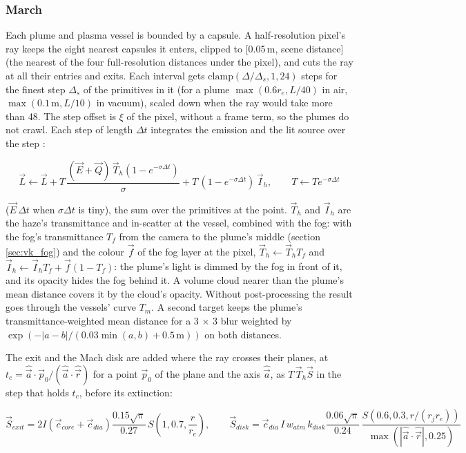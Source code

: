 \documentclass[Orbiter Technical Reference.tex]{subfiles}
\begin{document}
\begin{sloppypar}
\subsubsection{March}
Each plume and plasma vessel is bounded by a capsule. A half-resolution pixel's ray keeps the eight nearest capsules it enters, clipped to [0.05\,m, scene distance] (the nearest of the four full-resolution distances under the pixel), and cuts the ray at all their entries and exits. Each interval gets $\mathrm{clamp}(\Delta/\Delta_{s}, 1, 24)$ steps for the finest step $\Delta_{s}$ of the primitives in it (for a plume $\max(0.6r_{e}, L/40)$ in air, $\max(0.1\,\mathrm{m}, L/10)$ in vacuum), scaled down when the ray would take more than 48. The step offset is $\xi$ of the pixel, without a frame term, so the plumes do not crawl. Each step of length $\Delta t$ integrates the emission and the lit source over the step \cite{hillaire2015}:

\[ \vec{L} \leftarrow \vec{L} + T\,\frac{(\vec{E} + \vec{Q})\,\vec{T}_{h}(1 - e^{-\sigma\Delta t})}{\sigma} + T\,(1 - e^{-\sigma\Delta t})\,\vec{I}_{h}, \qquad T \leftarrow T e^{-\sigma\Delta t} \]

\noindent
($\vec{E}\,\Delta t$ when $\sigma\Delta t$ is tiny), the sum over the primitives at the point. $\vec{T}_{h}$ and $\vec{I}_{h}$ are the haze's transmittance and in-scatter at the vessel, combined with the fog: with the fog's transmittance $T_{f}$ from the camera to the plume's middle (section \ref{sec:vk_fog}) and the colour $\vec{f}$ of the fog layer at the pixel, $\vec{T}_{h} \leftarrow \vec{T}_{h}T_{f}$ and $\vec{I}_{h} \leftarrow \vec{I}_{h}T_{f} + \vec{f}(1 - T_{f})$: the plume's light is dimmed by the fog in front of it, and its opacity hides the fog behind it. A volume cloud nearer than the plume's mean distance covers it by the cloud's opacity. Without post-processing the result goes through the vessels' curve $T_{m}$. A second target keeps the plume's transmittance-weighted mean distance for a 3 $\times$ 3 blur weighted by $\exp(-|a - b|/(0.03\min(a,b) + 0.5\,\mathrm{m}))$ on both distances.

\noindent
The exit and the Mach disk are added where the ray crosses their planes, at $t_{c} = \hat{\vec{a}}\cdot\vec{p}_{0}/(\hat{\vec{a}}\cdot\hat{\vec{r}})$ for a point $\vec{p}_{0}$ of the plane and the axis $\hat{\vec{a}}$, as $T\,\vec{T}_{h}\vec{S}$ in the step that holds $t_{c}$, before its extinction:

\[ \vec{S}_{exit} = 2I(\vec{c}_{core} + \vec{c}_{dia})\frac{0.15\sqrt{\pi}}{0.27}\,S\left(1, 0.7, \frac{r}{r_{e}}\right), \qquad \vec{S}_{disk} = \vec{c}_{dia}\,I\,w_{atm}\,k_{disk}\frac{0.06\sqrt{\pi}}{0.24}\,\frac{S(0.6, 0.3, r/(r_{j}r_{e}))}{\max(|\hat{\vec{a}}\cdot\hat{\vec{r}}|, 0.25)} \]


\end{sloppypar}
\end{document}
